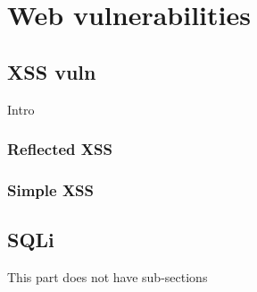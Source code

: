 \chapter{Web vulnerabilities}

\section{XSS vuln}

Intro

\subsection{Reflected XSS}


\subsection{Simple XSS}


\section{SQLi}

This part does not have sub-sections
